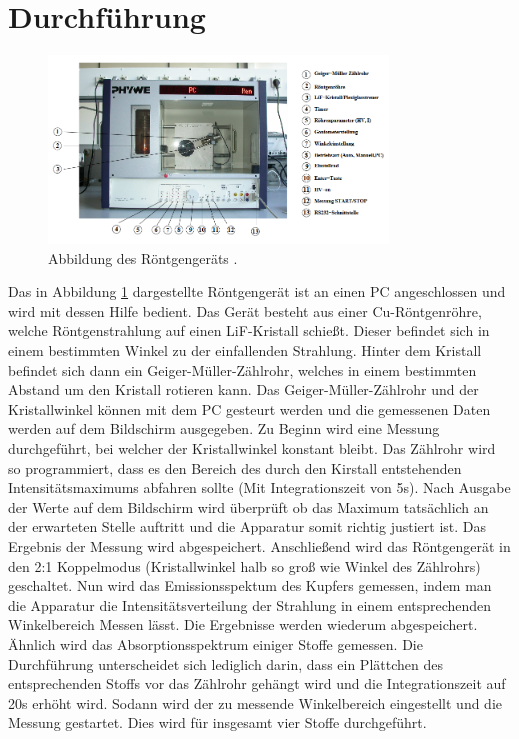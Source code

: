 \section{Durchführung}
\label{sec:Durchführung}
\begin{figure}[H]
  \centering
  \includegraphics[height=5cm]{geraet.PNG}
  \caption{Abbildung des Röntgengeräts \cite{sample}.}
  \label{fig:geraet}
\end{figure}

Das in Abbildung \ref{fig:geraet} dargestellte Röntgengerät ist an einen PC
angeschlossen und wird mit dessen Hilfe bedient. Das Gerät besteht aus einer Cu-Röntgenröhre, welche
Röntgenstrahlung auf einen LiF-Kristall schießt. Dieser befindet sich in einem bestimmten Winkel
zu der einfallenden Strahlung. Hinter dem Kristall befindet sich dann ein Geiger-Müller-Zählrohr, welches
in einem bestimmten Abstand um den Kristall rotieren kann. Das Geiger-Müller-Zählrohr und
der Kristallwinkel können mit dem PC gesteurt werden und die gemessenen Daten
werden auf dem Bildschirm ausgegeben.
Zu Beginn wird eine Messung durchgeführt, bei welcher der Kristallwinkel konstant
bleibt. Das Zählrohr wird so programmiert, dass es den Bereich des durch den
Kirstall entstehenden Intensitätsmaximums abfahren sollte (Mit Integrationszeit von 5s).
Nach Ausgabe der Werte auf dem Bildschirm wird überprüft ob das Maximum tatsächlich an der
erwarteten Stelle auftritt und die Apparatur somit richtig justiert ist. Das Ergebnis der
Messung wird abgespeichert.
Anschließend wird das Röntgengerät in den 2:1 Koppelmodus (Kristallwinkel halb so
groß wie Winkel des Zählrohrs) geschaltet.
Nun wird das Emissionsspektum des Kupfers gemessen, indem man die Apparatur
die Intensitätsverteilung der Strahlung in einem entsprechenden Winkelbereich
Messen lässt. Die Ergebnisse werden wiederum abgespeichert.
Ähnlich wird das Absorptionsspektrum einiger Stoffe gemessen. Die Durchführung unterscheidet
sich lediglich darin, dass ein Plättchen des entsprechenden Stoffs vor das Zählrohr
gehängt wird und die Integrationszeit auf 20s erhöht wird. Sodann wird der zu messende
Winkelbereich eingestellt und die Messung gestartet. Dies wird für insgesamt vier
Stoffe durchgeführt.
